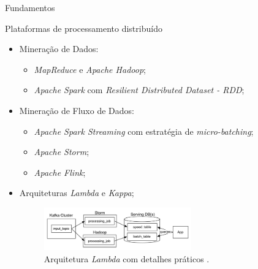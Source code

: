 \documentclass[aspectratio=43,10pt]{beamer}
\newcommand{\nota}[1]{\hspace*{-0.5cm}\textit{{\color[rgb]{1,0,0}Nota: #1}}}
\begin{document}
\begin{frame}[fragile]{Fundamentos}
\begin{alertblock}{Plataformas de processamento distribuído}
  \begin{itemize}[<+- | alert@+>]
    \item Mineração de Dados:
    \begin{itemize}
      \item \emph{MapReduce} e \emph{Apache Hadoop};
      \item \emph{Apache Spark} com \emph{Resilient Distributed Dataset - RDD};
    \end{itemize}
    \item Mineração de Fluxo de Dados:
    \begin{itemize}
      \item \emph{Apache Spark Streaming} com estratégia de \emph{micro-batching};
      \item \emph{Apache Storm};
      \item \emph{Apache Flink};
    \end{itemize}
    \item Arquiteturas \emph{Lambda} e \emph{Kappa};
    \begin{figure}[ht]
      \centering
      \includegraphics[width=0.6\textwidth]{figuras/lambda.png}
      \caption{Arquitetura \emph{Lambda} com detalhes práticos \cite{Kreps2014}.}
      \label{fig:lambda}
    \end{figure}
  \end{itemize}
\end{alertblock}



\end{frame}
\end{document}
